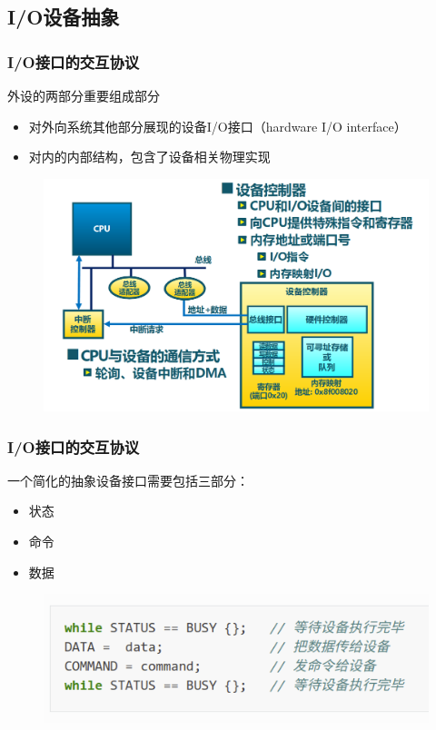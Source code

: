 \subsection{I/O设备抽象} %
\begin{frame}[fragile]
    \frametitle{I/O接口的交互协议}
    外设的两部分重要组成部分
    \begin{itemize}
        \item 对外向系统其他部分展现的设备I/O接口（hardware I/O interface）
        \item 对内的内部结构，包含了设备相关物理实现
    \end{itemize}
    \begin{figure}
    \includegraphics[width=0.5\linewidth]{figs/cpu-connect-dev.png}
\end{figure}
\end{frame}

\begin{frame}[fragile]
    \frametitle{I/O接口的交互协议}
    一个简化的抽象设备接口需要包括三部分：
    \begin{itemize}
        \item 状态
        \item 命令
        \item 数据
    \end{itemize}
    \begin{figure}
        \includegraphics[width=0.7\linewidth]{figs/simple-io-interface.png}
    \end{figure}
\end{frame}

